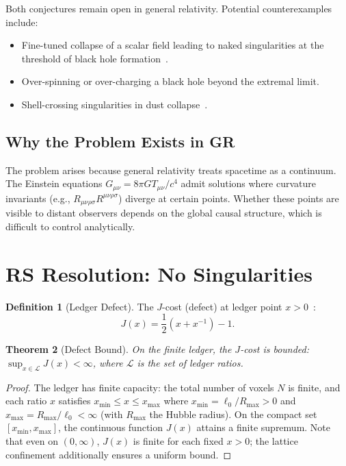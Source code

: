 \documentclass[12pt,a4paper]{article}
\newtheorem{theorem}{Theorem}[section]
\theoremstyle{definition}
\newtheorem{definition}[theorem]{Definition}
\theoremstyle{remark}
\begin{document}
Both conjectures remain open in general relativity.  Potential
counterexamples include:
\begin{itemize}
  \item Fine-tuned collapse of a scalar field leading to naked
  singularities at the threshold of black hole
  formation~\cite{Christodoulou1994}.
  \item Over-spinning or over-charging a black hole beyond the
  extremal limit.
  \item Shell-crossing singularities in dust
  collapse~\cite{Joshi2011}.
\end{itemize}

\subsection{Why the Problem Exists in GR}

The problem arises because general relativity treats spacetime as a
continuum.  The Einstein equations $G_{\mu\nu} = 8\pi G T_{\mu\nu}/
c^4$ admit solutions where curvature invariants (e.g.,
$R_{\mu\nu\rho\sigma} R^{\mu\nu\rho\sigma}$) diverge at certain
points.  Whether these points are visible to distant observers depends
on the global causal structure, which is difficult to control
analytically.

\section{RS Resolution: No Singularities}
\label{sec:resolution}

\begin{definition}[Ledger Defect]
The $J$-cost (defect) at ledger point $x > 0$~\cite{RS_Axioms}:
\begin{equation}
  J(x) = \frac{1}{2}\!\left(x + x^{-1}\right) - 1.
\end{equation}
\end{definition}

\begin{theorem}[Defect Bound]
\label{thm:defect-bound}
On the finite ledger, the $J$-cost is bounded:
$\sup_{x \in \mathcal{L}} J(x) < \infty$, where $\mathcal{L}$
is the set of ledger ratios.
\end{theorem}

\begin{proof}
The ledger has finite capacity: the total number of voxels $N$
is finite, and each ratio $x$ satisfies $x_{\min} \leq x \leq
x_{\max}$ where $x_{\min} = \ell_0/R_{\max} > 0$ and
$x_{\max} = R_{\max}/\ell_0 < \infty$ (with $R_{\max}$ the
Hubble radius).  On the compact set $[x_{\min}, x_{\max}]$,
the continuous function $J(x)$ attains a finite supremum.
Note that even on $(0,\infty)$, $J(x)$ is finite for each
fixed $x > 0$; the lattice confinement additionally ensures a
uniform bound.
\end{proof}
\end{document}

